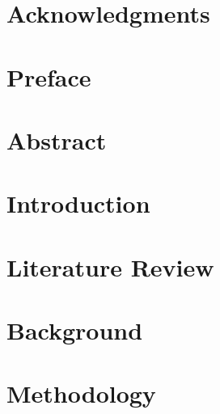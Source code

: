 \documentclass[12pt, twoside, openright]{report}
\begin{document}
	
	
	
	\chapter*{}
	
	
	\chapter*{Acknowledgments}
	
	\newpage
	
	\chapter*{Preface}
	
	
	\chapter*{Abstract}
	

	\tableofcontents
	\listoffigures
	\listoftables
	
	\chapter{Introduction}
	
	
	\chapter{Literature Review}
	
	
	\chapter{Background}
	
	
	\chapter{Methodology}
	
	
\end{document}
